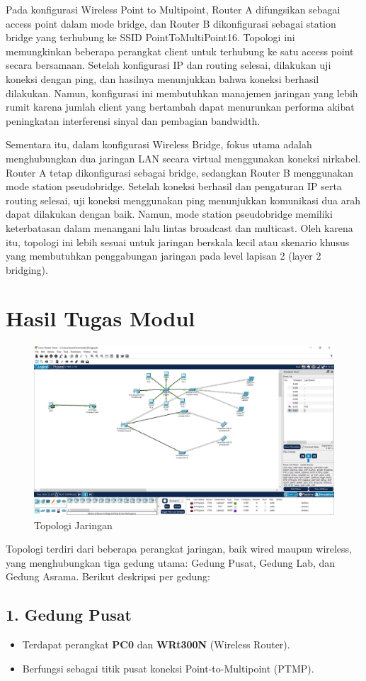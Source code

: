 Pada konfigurasi Wireless Point to Multipoint, Router A difungsikan sebagai access point dalam mode bridge, dan Router B dikonfigurasi sebagai station bridge yang terhubung ke SSID PointToMultiPoint16. Topologi ini memungkinkan beberapa perangkat client untuk terhubung ke satu access point secara bersamaan. Setelah konfigurasi IP dan routing selesai, dilakukan uji koneksi dengan ping, dan hasilnya menunjukkan bahwa koneksi berhasil dilakukan. Namun, konfigurasi ini membutuhkan manajemen jaringan yang lebih rumit karena jumlah client yang bertambah dapat menurunkan performa akibat peningkatan interferensi sinyal dan pembagian bandwidth.

Sementara itu, dalam konfigurasi Wireless Bridge, fokus utama adalah menghubungkan dua jaringan LAN secara virtual menggunakan koneksi nirkabel. Router A tetap dikonfigurasi sebagai bridge, sedangkan Router B menggunakan mode station pseudobridge. Setelah koneksi berhasil dan pengaturan IP serta routing selesai, uji koneksi menggunakan ping menunjukkan komunikasi dua arah dapat dilakukan dengan baik. Namun, mode station pseudobridge memiliki keterbatasan dalam menangani lalu lintas broadcast dan multicast. Oleh karena itu, topologi ini lebih sesuai untuk jaringan berskala kecil atau skenario khusus yang membutuhkan penggabungan jaringan pada level lapisan 2 (layer 2 bridging).

\section{Hasil Tugas Modul}

    \begin{figure}[H]
        \centering
        \includegraphics[width=0.5\linewidth]{P3/img/topologi.png}
        \caption{Topologi Jaringan}
        \label{fig:ping-bridge}
    \end{figure}
    
Topologi terdiri dari beberapa perangkat jaringan, baik wired maupun wireless, yang menghubungkan tiga gedung utama: Gedung Pusat, Gedung Lab, dan Gedung Asrama. Berikut deskripsi per gedung:

\subsection*{1. Gedung Pusat}
\begin{itemize}
    \item Terdapat perangkat \textbf{PC0} dan \textbf{WRt300N} (Wireless Router).
    \item Berfungsi sebagai titik pusat koneksi Point-to-Multipoint (PTMP).
\end{itemize}

